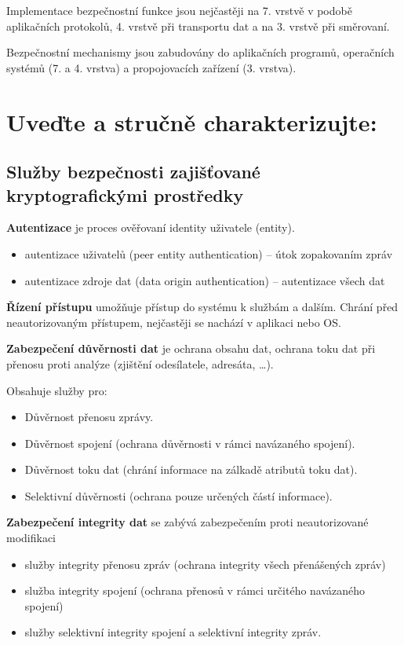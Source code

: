 Implementace bezpečnostní funkce jsou nejčastěji na 7. vrstvě v podobě aplikačních protokolů, 4. vrstvě při transportu dat a na 3. vrstvě při směrovaní.

Bezpečnostní mechanismy jsou zabudovány do aplikačních programů, operačních systémů (7. a 4. vrstva) a propojovacích zařízení (3. vrstva).

\section{Uveďte a stručně charakterizujte:}
\subsection{Služby bezpečnosti zajišťované kryptografickými prostředky}
\textbf{Autentizace} je proces ověřovaní identity uživatele (entity). 
\begin{itemize}
    \item autentizace uživatelů (peer entity authentication) -- útok zopakovaním zpráv
    \item autentizace zdroje dat (data origin authentication) -- autentizace všech dat
\end{itemize}

\textbf{Řízení přístupu} umožňuje přístup  do systému k službám a dalším. Chrání před neautorizovaným přístupem, nejčastěji se nachází v aplikaci nebo OS.

\textbf{Zabezpečení důvěrnosti dat} je ochrana obsahu dat, ochrana toku dat při přenosu proti analýze (zjištění odesílatele, adresáta, \dots). 

Obsahuje služby pro:
\begin{itemize}[noitemsep]
    \item Důvěrnost přenosu zprávy.
    \item Důvěrnost spojení (ochrana důvěrnosti v rámci navázaného spojení).
    \item Důvěrnost toku dat (chrání informace na zálkadě atributů toku dat).
    \item Selektivní důvěrnosti (ochrana pouze určených částí informace).
\end{itemize}

\textbf{Zabezpečení integrity dat} se zabývá zabezpečením proti neautorizované modifikaci 
\begin{itemize}
    \item služby integrity přenosu zpráv (ochrana integrity všech přenášených zpráv)
    \item služba integrity spojení (ochrana přenosů v rámci určitého navázaného spojení)
    \item služby selektivní integrity spojení a selektivní integrity zpráv.
\end{itemize}


